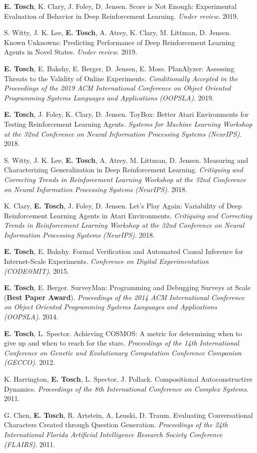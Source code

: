 \documentclass[10pt]{article}
\newcommand{\cvsec}[2]{
    \begin{tcolorbox}[width=\textwidth, breakable, title={#1}]
        #2
    \end{tcolorbox}
    \vspace{10pt}
}
\newcommand{\pub}[4]{
  \parbox{\textwidth}{
    #1. #2. \textit{#3}. #4.
    \vspace{5pt}
  }
}
\newcommand{\me}{\textbf{E. Tosch}}
\begin{document}
\cvsec{Publications}{
  \pub{\me{}, K. Clary, J. Foley, D. Jensen}{Score is Not Enough: Experimental Evaluation of Behavior in Deep Reinforcement Learning}{Under review}{2019}
  \pub{S. Witty, J. K. Lee, \me{}, A. Atrey, K. Clary, M. Littman, D. Jensen}{Known Unknowns: Predicting Performance of Deep Reinforcement Learning Agents in Novel States}{Under review}{2019}
  \pub{\me{}, E. Bakshy, E. Berger, D. Jensen, E. Moss}{PlanAlyzer: Assessing Threats to the Validity of Online Experiments}{Conditionally Accepted in the Proceedings of the 2019 ACM International Conference on Object Oriented Programming Systems Languages and Applications (OOPSLA)}{2019}
  \pub{\me{}, J. Foley, K. Clary, D. Jensen}{ToyBox: Better Atari Environments for Testing Reinforcement Learning Agents}{Systems for Machine Learning Workshop at the 32nd Conference on Neural Information Processing Systems (NeurIPS)}{2018}
  \pub{S. Witty, J. K. Lee, \me{}, A. Atrey, M. Littman, D. Jensen}{Measuring and Characterizing Generalization in Deep Reinforcement Learning}{Critiquing and Correcting Trends in Reinforcement Learning Workshop at the 32nd Conference on Neural Information Processing Systems (NeurIPS)}{2018}
  \pub{K. Clary, \me{}, J. Foley, D. Jensen}{Let's Play Again: Variability of Deep Reinforcement Learning Agents in Atari Environments}{Critiquing and Correcting Trends in Reinforcement Learning Workshop at the 32nd Conference on Neural Information Processing Systems (NeurIPS)}{2018}
  \pub{\me{}, E. Bakshy}{Formal Verification and Automated Causal Inference for Internet-Scale Experiments}{Conference on Digital Experimentation (CODE@MIT)}{2015}
  \pub{\me{}, E. Berger}{SurveyMan: Programming and Debugging Surveys at Scale (\textbf{Best Paper Award})}{Proceedings of the 2014 ACM International Conference on Object Oriented Programming Systems Languages and Applications (OOPSLA)}{2014}
  \pub{\me{}, L. Spector}{Achieving COSMOS: A metric for determining when to give up and when to reach for the stars}{Proceedings of the 14th International Conference on Genetic and Evolutionary Computation Conference Companion (GECCO)}{2012}
  \pub{K. Harrington, \me{}, L. Spector, J. Pollack}{Compositional Autoconstructive Dynamics}{Proceedings of the 8th International Conference on Complex Systems}{2011}
  \pub{G. Chen, \me{}, R. Artstein, A. Leuski, D. Traum}{Evaluating Conversational Characters Created through Question Generation}{Proceedings of the 24th International Florida Artificial Intelligence Research Society Conference (FLAIRS)}{2011}
}
\end{document}
